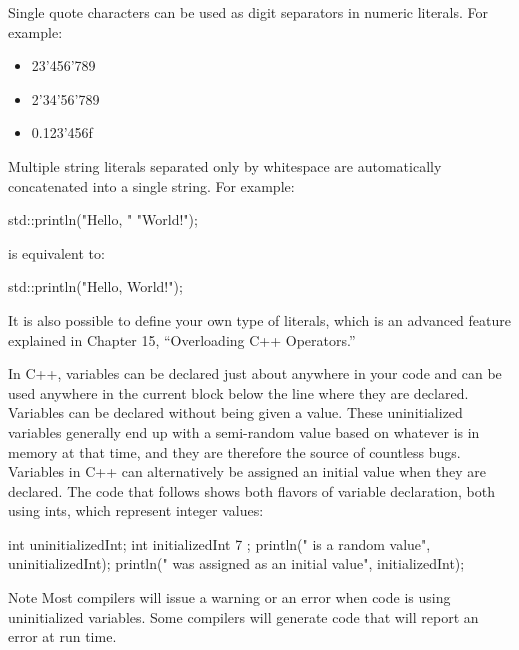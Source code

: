 Single quote characters can be used as digit separators in numeric literals. For example:

\begin{itemize}
\item
23'456'789

\item
2'34'56'789

\item
0.123'456f
\end{itemize}

Multiple string literals separated only by whitespace are automatically concatenated into a single string. For example:

\begin{cpp}
std::println("Hello, "
             "World!");
\end{cpp}

is equivalent to:

\begin{cpp}
std::println("Hello, World!");
\end{cpp}

It is also possible to define your own type of literals, which is an advanced feature explained in Chapter 15, “Overloading C++ Operators.”


In C++, variables can be declared just about anywhere in your code and can be used anywhere in the current block below the line where they are declared. Variables can be declared without being given a value. These uninitialized variables generally end up with a semi-random value based on whatever is in memory at that time, and they are therefore the source of countless bugs. Variables in C++ can alternatively be assigned an initial value when they are declared. The code that follows shows both flavors of variable declaration, both using ints, which represent integer values:

\begin{cpp}
int uninitializedInt;
int initializedInt { 7 };
println("{} is a random value", uninitializedInt);
println("{} was assigned as an initial value", initializedInt);
\end{cpp}

\begin{myNotic}{Note}
Most compilers will issue a warning or an error when code is using uninitialized variables. Some compilers will generate code that will report an error at run time.
\end{myNotic}

